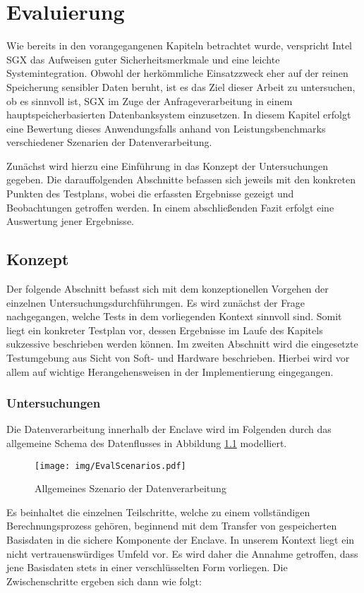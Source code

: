 
\chapter{Evaluierung}

Wie bereits in den vorangegangenen Kapiteln betrachtet wurde, verspricht Intel \ac{SGX} das Aufweisen guter Sicherheitsmerkmale und eine leichte Systemintegration. Obwohl der herkömmliche Einsatzzweck eher auf der reinen Speicherung sensibler Daten beruht, ist es das Ziel dieser Arbeit zu untersuchen, ob es sinnvoll ist, \ac{SGX} im Zuge der Anfrageverarbeitung in einem hauptspeicherbasierten Datenbanksystem einzusetzen. In diesem Kapitel erfolgt eine Bewertung dieses Anwendungsfalls anhand von Leistungsbenchmarks verschiedener Szenarien der Datenverarbeitung.

Zunächst wird hierzu eine Einführung in das Konzept der Untersuchungen gegeben. Die darauffolgenden Abschnitte befassen sich jeweils mit den konkreten Punkten des Testplans, wobei die erfassten Ergebnisse gezeigt und Beobachtungen getroffen werden. In einem abschließenden Fazit erfolgt eine Auswertung jener Ergebnisse.

\section{Konzept}

Der folgende Abschnitt befasst sich mit dem konzeptionellen Vorgehen der einzelnen Untersuchungsdurchführungen. Es wird zunächst der Frage nachgegangen, welche Tests in dem vorliegenden Kontext sinnvoll sind. Somit liegt ein konkreter Testplan vor, dessen Ergebnisse im Laufe des Kapitels sukzessive beschrieben werden können. Im zweiten Abschnitt wird die eingesetzte Testumgebung aus Sicht von Soft- und Hardware beschrieben. Hierbei wird vor allem auf wichtige Herangehensweisen in der Implementierung eingegangen.

\subsection{Untersuchungen}

Die Datenverarbeitung innerhalb der Enclave wird im Folgenden durch das allgemeine Schema des Datenflusses in Abbildung \ref{fig:scenarios} modelliert.
\begin{figure}
	\texttt{[image: img/EvalScenarios.pdf]}
	\centering
	\caption{Allgemeines Szenario der Datenverarbeitung}
	\label{fig:scenarios}
\end{figure} 
Es beinhaltet die einzelnen Teilschritte, welche zu einem vollständigen Berechnungsprozess gehören, beginnend mit dem Transfer von gespeicherten Basisdaten in die sichere Komponente der Enclave. In unserem Kontext liegt ein nicht vertrauenswürdiges Umfeld vor. Es wird daher die Annahme getroffen, dass jene Basisdaten stets in einer verschlüsselten Form vorliegen. Die Zwischenschritte ergeben sich dann wie folgt:

